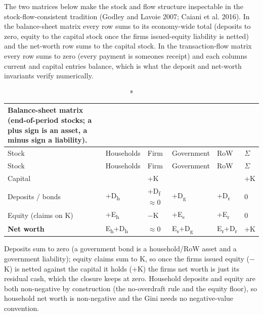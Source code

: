 \documentclass[12pt]{article}
\begin{document}
The two matrices below make the stock and flow structure inspectable in
the stock-flow-consistent tradition (Godley and Lavoie 2007; Caiani et
al. 2016). In the balance-sheet matrix every row sums to its
economy-wide total (deposits to zero, equity to the capital stock once
the firm\textquotesingle s issued-equity liability is netted) and the
net-worth row sums to the capital stock. In the transaction-flow matrix
every row sums to zero (every payment is someone\textquotesingle s
receipt) and each column\textquotesingle s current and capital entries
balance, which is what the deposit and net-worth invariants verify
numerically.

\begin{longtable}[]{@{}llllll@{}}
\caption*{Balance-sheet matrix (end-of-period stocks; a plus sign is an
asset, a minus sign a liability).}\tabularnewline
\toprule\noalign{}
Stock & Households & Firm & Government & RoW & $\Sigma$ \\
\midrule\noalign{}
\endfirsthead
\toprule\noalign{}
Stock & Households & Firm & Government & RoW & $\Sigma$ \\
\midrule\noalign{}
\endhead
\bottomrule\noalign{}
\endlastfoot
Capital & & +K & & & +K \\
Deposits / bonds & +D\textsubscript{h} & +D\textsubscript{f}$\approx$0 &
+D\textsubscript{g} & +D\textsubscript{r} & 0 \\
Equity (claims on K) & +E\textsubscript{h} & $-$K & +E\textsubscript{s} &
+E\textsubscript{r} & 0 \\
\textbf{Net worth} & E\textsubscript{h}+D\textsubscript{h} & $\approx$0 &
E\textsubscript{s}+D\textsubscript{g} &
E\textsubscript{r}+D\textsubscript{r} & +K \\
\end{longtable}

Deposits sum to zero (a government bond is a household/RoW asset and a
government liability); equity claims sum to K, so once the
firm\textquotesingle s issued equity ($-$K) is netted against the capital
it holds (+K) the firm\textquotesingle s net worth is just its residual
cash, which the closure keeps at zero. Household deposits and equity are
both non-negative by construction (the no-overdraft rule and the equity
floor), so household net worth is non-negative and the Gini needs no
negative-value convention.
\end{document}
